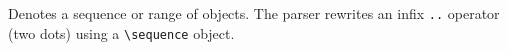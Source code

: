 
Denotes a sequence or range of objects. The parser rewrites an
infix \verb|..| operator (two dots) using a \verb|\sequence| object.



